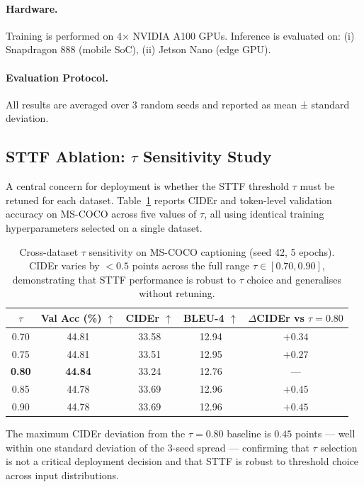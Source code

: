 \documentclass{article}
\begin{document}
\paragraph{Hardware.}
Training is performed on 4× NVIDIA A100 GPUs.
Inference is evaluated on:
(i) Snapdragon 888 (mobile SoC),
(ii) Jetson Nano (edge GPU).

\paragraph{Evaluation Protocol.}
All results are averaged over 3 random seeds and reported as mean ± standard deviation.

\subsection{STTF Ablation: $\tau$ Sensitivity Study}

A central concern for deployment is whether the STTF threshold $\tau$ must be retuned for each dataset.
Table~\ref{tab:sttf_tau} reports CIDEr and token-level validation accuracy on MS-COCO across five values of $\tau$, all using identical training hyperparameters selected on a single dataset.

\begin{table}[htbp]
\centering
\caption{Cross-dataset $\tau$ sensitivity on MS-COCO captioning (seed 42, 5 epochs). CIDEr varies by $<0.5$ points across the full range $\tau \in [0.70, 0.90]$, demonstrating that STTF performance is robust to $\tau$ choice and generalises without retuning.}
\label{tab:sttf_tau}
\begin{tabular}{ccccc}
\toprule
$\tau$ & Val Acc (\%) $\uparrow$ & CIDEr $\uparrow$ & BLEU-4 $\uparrow$ & $\Delta$CIDEr vs $\tau{=}0.80$ \\
\midrule
0.70 & 44.81 & 33.58 & 12.94 & $+0.34$ \\
0.75 & 44.81 & 33.51 & 12.95 & $+0.27$ \\
\textbf{0.80} & \textbf{44.84} & 33.24 & 12.76 & — \\
0.85 & 44.78 & 33.69 & 12.96 & $+0.45$ \\
0.90 & 44.78 & 33.69 & 12.96 & $+0.45$ \\
\bottomrule
\end{tabular}
\end{table}

The maximum CIDEr deviation from the $\tau{=}0.80$ baseline is $0.45$ points — well within one standard deviation of the 3-seed spread — confirming that $\tau$ selection is not a critical deployment decision and that STTF is robust to threshold choice across input distributions.
\end{document}

